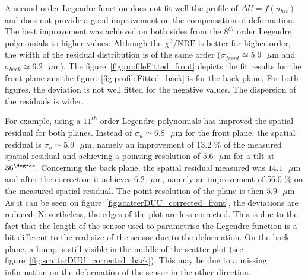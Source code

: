       A second-order Legendre function does not fit well the profile of $\Delta U=f(u_{hit})$ and does not provide a good improvement on the compensation of deformation.
      The best improvement was achieved on both sides from the $8^{th}$ order Legendre polynomials to higher values.
      Although the $\chi^2 \text{/NDF}$ is better for higher order, the width of the residual distribution is of the same order ($\sigma_{front}\simeq 5.9 \text{ }\mu\text{m}$ and $\sigma_{back} \simeq 6.2 \text{ }\mu\text{m}$).
      The figure~\ref{fig:profileFitted_front} depicts the fit results for the front plane ans the figure~\ref{fig:profileFitted_back} is for the back plane.
      For both figures, the deviation is not well fitted for the negative values.
      The dispersion of the residuals is wider. 

      For example, using a $11^{th}$ order Legendre polynomials has improved the spatial residual for both planes. 
      Instead of $\sigma_{u} \simeq 6.8 \text{ }\mu\text{m}$ for the front plane, the spatial residual is $\sigma_{u} \simeq 5.9 \text{ }\mu\text{m}$, namely an improvement of 13.2 \% of the measured spatial residual and achieving a pointing resolution of $5.6 \text{ }\mu\text{m}$ for a tilt at $36^{\degree}$.
      Concerning the back plane, the spatial residual measured was $14.1 \text{ }\mu\text{m}$ and after the correction it achieves $6.2 \text{ }\mu\text{m}$, namely an improvement of 56.0 \% on the measured spatial residual.
      The point resolution of the plane is then $5.9 \text{ }\mu\text{m}$
      As it can be seen on figure~\ref{fig:scatterDUU_corrected_front}, the deviations are reduced. 
      Nevertheless, the edges of the plot are less corrected.
      This is due to the fact that the length of the sensor used to parametrise the Legendre function is a bit different to the real size of the sensor due to the deformation.
      On the back plane, a bump is still visible in the middle of the scatter plot (see figure~\ref{fig:scatterDUU_corrected_back}).
      This may be due to a missing information on the deformation of the sensor in the other direction.

